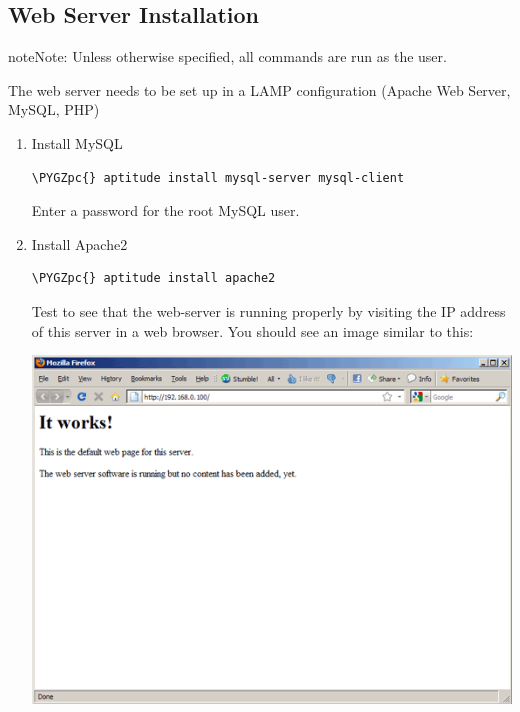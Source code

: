 \documentclass[letterpaper,10pt,english]{sphinxmanual}
\def\PYGZpc{\char`\%}
\begin{document}
\subsection{Web Server Installation}
\label{installation:web-server-installation}
\begin{notice}{note}{Note:}
Unless otherwise specified, all commands are run as the  user.
\end{notice}

The web server needs to be set up in a LAMP configuration (Apache Web Server,
MySQL, PHP)
\begin{enumerate}
\item {} 
Install MySQL

\begin{Verbatim}[commandchars=\\\{\},formatcom=\footnotesize]
\PYGZpc{} aptitude install mysql-server mysql-client
\end{Verbatim}

Enter a password for the root MySQL user.

\item {} 
Install Apache2

\begin{Verbatim}[commandchars=\\\{\},formatcom=\footnotesize]
\PYGZpc{} aptitude install apache2
\end{Verbatim}

Test to see that the web-server is running properly by visiting the IP
address of this server in a web browser. You should see an image similar to
this:

\includegraphics{apache2.png}


\end{enumerate}
\end{document}
